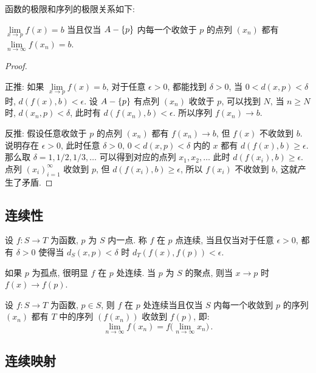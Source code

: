 \documentclass[UTF8]{ctexart}
\theoremstyle{mystyle}
\DeclarePairedDelimiter\set{\lbrace}{\rbrace}
\begin{document}
函数的极限和序列的极限关系如下:
\begin{proposition}
    $ \lim\limits_{x \to p} f(x) = b $ 当且仅当 $ A - \set{p} $ 内每一个收敛于 $ p $ 的点列 $ (x_n) $ 都有 $ \lim\limits_{n \to \infty} f(x_n) = b $.
\end{proposition}

\begin{proof} \ 

    正推: 如果 $ \lim\limits_{x \to p} f(x) = b $, 对于任意 $ \epsilon > 0 $, 都能找到 $ \delta > 0 $, 当 $ 0 < d(x, p) < \delta $ 时, $ d(f(x), b) < \epsilon $. 设 $ A - \set{p} $ 有点列 $ (x_n) $ 收敛于 $ p $, 可以找到 $ N $, 当 $ n \geqslant N $ 时, $ d(x_n, p) < \delta $, 此时有 $ d(f(x_n), b) < \epsilon $. 所以序列 $ f(x_n) \to b $.

    反推: 假设任意收敛于 $ p $ 的点列 $ (x_n) $ 都有 $ f(x_n) \to b $, 但 $ f(x) $ 不收敛到 $ b $. 说明存在 $ \epsilon > 0 $, 此时任意 $ \delta > 0 $, $ 0 < d(x, p) < \delta $ 内的 $ x $ 都有 $ d(f(x), b) \geqslant \epsilon $. 那么取 $ \delta = 1, 1/2, 1/3, \dots $ 可以得到对应的点列 $ x_1, x_2, \dots $ 此时 $ d(f(x_i), b) \geqslant \epsilon $. 点列 $ (x_i)_{i = 1}^{\infty} $ 收敛到 $ p $, 但 $ d(f(x_i), b) \geqslant \epsilon $, 所以 $ f(x_i) $ 不收敛到 $ b $, 这就产生了矛盾.
\end{proof}

\subsection{连续性}
\begin{definition}
    设 $ f \colon S \to T $ 为函数, $ p $ 为 $ S $ 内一点. 称 $ f $ 在 $ p $ 点连续, 当且仅当对于任意 $ \epsilon > 0 $, 都有 $ \delta > 0 $ 使得当 $ d_S(x, p) < \delta $ 时 $ d_T(f(x), f(p)) < \epsilon $.
\end{definition}

如果 $ p $ 为孤点, 很明显 $ f $ 在 $ p $ 处连续. 当 $ p $ 为 $ S $ 的聚点, 则当 $ x \to p $ 时 $ f(x) \to f(p) $.

\begin{proposition}
    设 $ f \colon S \to T $ 为函数, $ p \in S $, 则 $ f $ 在 $ p $ 处连续当且仅当 $ S $ 内每一个收敛到 $ p $ 的序列 $ (x_n) $ 都有 $ T $ 中的序列 $ (f(x_n)) $ 收敛到 $ f(p) $, 即:
    \[ 
        \lim_{n \to \infty} f(x_n) = f \big( \lim_{n \to \infty} x_n \big) \,.
    \]
\end{proposition}

\subsection{连续映射}
\end{document}
